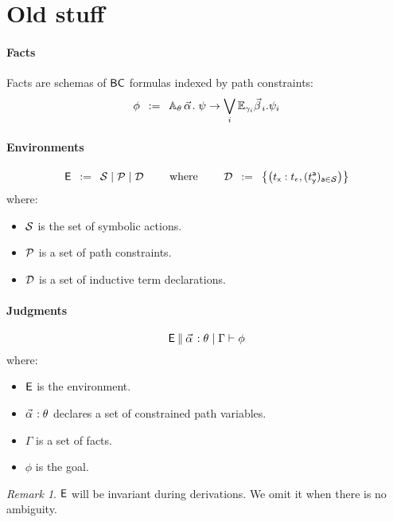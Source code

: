 \documentclass[a4paper]{article}
\theoremstyle{remark}
\newtheorem{remark}{Remark}
\begin{document}
\newpage

\section{Old stuff}



\paragraph{Facts}
Facts are schemas of $\textsf{BC}$ formulas indexed by path constraints:
\[
  \phi \mdef
  \cforall_\theta\, \valpha.\;
  \psi
  \ra
  \bigvee_{i}
  \cexists_\gammai \vbetai. \psi_i
\]

\paragraph{Environments}
\[
  \textsf{E} \;\;\mathbin{:=}\;\;
  \mathcal{S} \mid
  \mathcal{P} \mid
  \mathcal{D}
  \qquad
  \text{ where }
  \qquad
  \mathcal{D} \;\;\mathbin{:=}\;\;
  \left\{
    \left(t_{\textsf{x}} : t_\epsilon,(t_{\textsf{y}}^{\textsf{a}})_{{\textsf{a}} \in \mathcal{S}}\right)
  \right\}
\]
where:
\begin{itemize}
\item $\mathcal{S}$ is the set of symbolic actions.
\item $\mathcal{P}$ is a set of path constraints.
\item $\mathcal{D}$ is a set of inductive term declarations.
\end{itemize}
\paragraph{Judgments}
\[
  \ejudge{\env}{\facts{\valpha}{\theta}{\Gamma}}{\phi}
\]
where:
\begin{itemize}
\item $\textsf{E}$ is the environment.
\item $\pvtype{\valpha}{\theta}$ declares a set of constrained path variables.
\item $\Gamma$ is a set of facts.
\item $\phi$ is the goal.
\end{itemize}

\begin{remark}
  $\textsf{E}$ will be invariant during derivations. We omit it when there is no ambiguity.
\end{remark}
\end{document}
